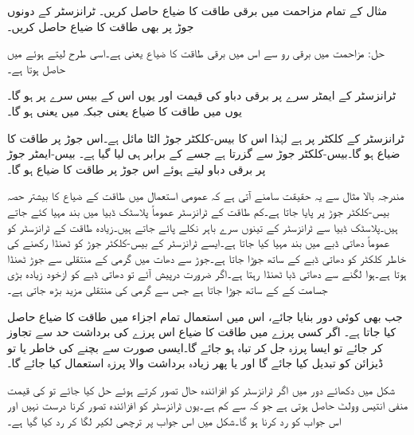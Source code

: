 مثال   کے تمام مزاحمت میں برقی طاقت کا ضیاع حاصل کریں۔ ٹرانزسٹر کے دونوں جوڑ پر بھی طاقت کا ضیاع حاصل کریں۔

حل: مزاحمت  میں   برقی رو سے اس میں برقی طاقت کا ضیاع  یعنی  ہے۔اسی طرح  لیتے ہوئے  میں  حاصل ہوتا ہے۔

ٹرانزسٹر کے ایمٹر سرے پر برقی دباو  کی قیمت  اور یوں اس کے بیس سرے پر  ہو گا۔یوں  میں طاقت کا ضیاع   یعنی  جبکہ  میں  یعنی    ہو گا۔

ٹرانزسٹر کے کلکٹر  پر  ہے لہٰذا اس کا بیس-کلکٹر جوڑ  الٹا مائل ہے۔اس جوڑ پر طاقت کا ضیاع   ہو گا۔بیس-کلکٹر جوڑ سے  گزرتا ہے جسے  کے برابر ہی لیا گیا ہے۔ بیس-ایمٹر  جوڑ  پر برقی دباو  لیتے ہوئے اس جوڑ پر طاقت کا ضیاع  ہو گا۔ 

مندرجہ بالا مثال سے یہ حقیقت سامنے آتی ہے کہ عمومی استعمال میں طاقت کے ضیاع کا بیشتر حصہ  بیس-کلکٹر جوڑ پر  پایا جاتا ہے۔کم طاقت کے ٹرانزسٹر عموماً پلاسٹک ڈبیا میں بند مہیا کئے جاتے ہیں۔پلاسٹک ڈبیا سے ٹرانزسٹر کے تینوں سرے باہر نکلے پائے جاتے ہیں۔زیادہ طاقت کے ٹرانزسٹر کو عموماً دھاتی ڈبے میں بند مہیا کیا جاتا ہے۔ایسے ٹرانزسٹر کے بیس-کلکٹر جوڑ کو ٹھنڈا رکھنے کی خاطر کلکٹر  کو دھاتی ڈبے  کے ساتھ جوڑا جاتا ہے۔جوڑ سے دھات میں گرمی کے منتقلی سے جوڑ ٹھنڈا ہوتا ہے۔ہوا لگنے سے دھاتی ڈبا ٹھنڈا رہتا ہے۔اگر ضرورت درپیش آئے تو دھاتی ڈبے کو ازخود زیادہ بڑی جسامت کے  کے ساتھ جوڑا جاتا ہے جس سے گرمی کی منتقلی مزید بڑھ جاتی ہے۔    
 
جب بھی کوئی دور بنایا جائے، اس میں استعمال تمام اجزاء میں طاقت کا ضیاع حاصل کیا جاتا ہے۔ اگر کسی پرزے میں طاقت کا ضیاع اس پرزے کی برداشت حد سے تجاوز کر جائے تو ایسا پرزہ جل کر تباہ ہو جائے گا۔ایسی صورت سے بچنے کی خاطر یا تو ڈیزائن کو تبدیل کیا جائے گا اور یا پھر زیادہ برداشت والا پرزہ استعمال کیا جائے گا۔

شکل   میں دکھائے دور میں اگر ٹرانزسٹر کو افزائندہ حال تصور کرتے ہوئے حل کیا جائے تو  کی قیمت منفی انتیس وولٹ  حاصل ہوتی ہے جو کہ  سے کم ہے۔یوں ٹرانزسٹر کو افزائندہ تصور کرنا درست نہیں اور اس جواب کو رد کرنا ہو گا۔شکل میں اس جواب پر ترچھی لکیر لگا کر رد کیا گیا ہے۔


